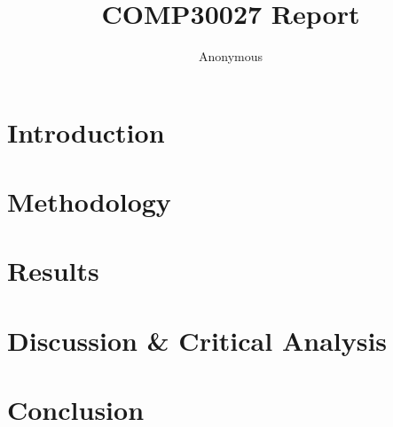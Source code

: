 \documentclass[11pt]{article}
\title{COMP30027 Report}
\author
{Anonymous}
\begin{document}
\maketitle



\section{Introduction}


\section{Methodology}


\section{Results}


\section{Discussion \& Critical Analysis}


\section{Conclusion}

\end{document}
